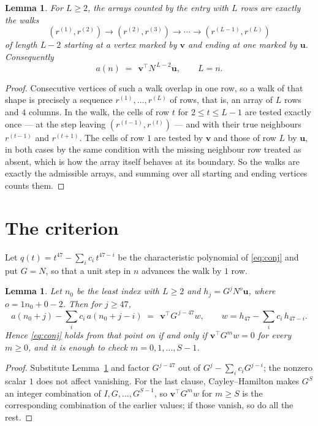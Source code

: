 \documentclass[11pt,a4paper]{article}
\theoremstyle{plain}
\newtheorem{lemma}[theorem]{Lemma}
\theoremstyle{definition}
\begin{document}
\begin{lemma}\label{lem:walk}
For $L\ge2$, the arrays counted by the entry with $L$ rows are exactly the walks
\[
(r^{(1)},r^{(2)})\to(r^{(2)},r^{(3)})\to\cdots\to(r^{(L-1)},r^{(L)})
\]
of length $L-2$ starting at a vertex marked by $\mathbf{v}$ and ending at one marked by
$\mathbf{u}$. Consequently
\[
a(n)\;=\;\,\mathbf{v}^{\!\top}N^{\,L-2}\mathbf{u},\qquad L=n .
\]
\end{lemma}

\begin{proof}
Consecutive vertices of such a walk overlap in one row, so a walk of that shape is
precisely a sequence $r^{(1)},\dots,r^{(L)}$ of rows, that is, an array of $L$ rows
and $4$ columns. In the walk, the cells of row $t$ for $2\le t\le L-1$ are tested
exactly once --- at the step leaving $(r^{(t-1)},r^{(t)})$ --- and with their true
neighbours $r^{(t-1)}$ and $r^{(t+1)}$. The cells of row $1$ are tested by
$\mathbf{v}$ and those of row $L$ by $\mathbf{u}$, in both cases by the same condition
with the missing neighbour row treated as absent, which is how the array itself behaves at
its boundary. So the walks are exactly the admissible arrays, and summing over all starting
and ending vertices counts them.
\end{proof}

\section{The criterion}

Let $q(t)=t^{47}-\sum_i c_i\,t^{47-i}$ be the characteristic polynomial of
\eqref{eq:conj} and put $G=N$, so that a unit step in $n$ advances the walk by
$1$ row.

\begin{lemma}\label{lem:crit}
Let $n_0$ be the least index with $L\ge2$ and $h_j=G^{j}N^{o}\mathbf{u}$, where
$o=1n_0+0-2$. Then for $j\ge47$,
\[
a(n_0+j)-\sum_i c_i\,a(n_0+j-i)\;=\;\,\mathbf{v}^{\!\top}G^{\,j-47}w,
\qquad w=h_{47}-\sum_i c_i\,h_{47-i} .
\]
Hence \eqref{eq:conj} holds from that point on if and only if
$\mathbf{v}^{\!\top}G^{m}w=0$ for every $m\ge0$, and it is enough to check
$m=0,1,\dots,S-1$.
\end{lemma}

\begin{proof}
Substitute Lemma~\ref{lem:walk} and factor $G^{j-47}$ out of
$G^{j}-\sum_ic_iG^{j-i}$; the nonzero scalar $1$ does not affect
vanishing. For the last clause, Cayley--Hamilton makes $G^{S}$ an integer combination of
$I,G,\dots,G^{S-1}$, so $\mathbf{v}^{\!\top}G^{m}w$ for $m\ge S$ is the corresponding
combination of the earlier values; if those vanish, so do all the rest.
\end{proof}
\end{document}
